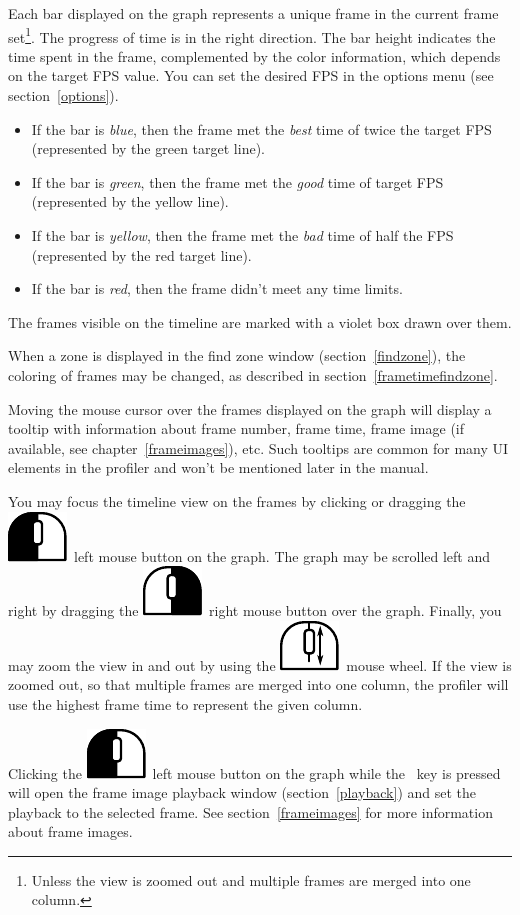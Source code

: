 \documentclass[hidelinks,titlepage,a4paper]{article}
\newcommand{\LMB}{\includegraphics[height=.8\baselineskip]{icons/lmb}}
\newcommand{\RMB}{\includegraphics[height=.8\baselineskip]{icons/rmb}}
\newcommand{\Scroll}{\includegraphics[height=.8\baselineskip]{icons/scroll}}
\begin{document}
Each bar displayed on the graph represents a unique frame in the current frame set\footnote{Unless the view is zoomed out and multiple frames are merged into one column.}. The progress of time is in the right direction. The bar height indicates the time spent in the frame, complemented by the color information, which depends on the target FPS value. You can set the desired FPS in the options menu (see section~\ref{options}).

\begin{itemize}
\item If the bar is \emph{blue}, then the frame met the \emph{best} time of twice the target FPS (represented by the green target line).
\item If the bar is \emph{green}, then the frame met the \emph{good} time of target FPS (represented by the yellow line).
\item If the bar is \emph{yellow}, then the frame met the \emph{bad} time of half the FPS (represented by the red target line).
\item If the bar is \emph{red}, then the frame didn't meet any time limits.
\end{itemize}

The frames visible on the timeline are marked with a violet box drawn over them.

When a zone is displayed in the find zone window (section~\ref{findzone}), the coloring of frames may be changed, as described in section~\ref{frametimefindzone}.

Moving the \faMousePointer{} mouse cursor over the frames displayed on the graph will display a tooltip with information about frame number, frame time, frame image (if available, see chapter~\ref{frameimages}), etc. Such tooltips are common for many UI elements in the profiler and won't be mentioned later in the manual.

You may focus the timeline view on the frames by clicking or dragging the \LMB{}~left mouse button on the graph. The graph may be scrolled left and right by dragging the \RMB{}~right mouse button over the graph. Finally, you may zoom the view in and out by using the \Scroll{}~mouse wheel. If the view is zoomed out, so that multiple frames are merged into one column, the profiler will use the highest frame time to represent the given column.

Clicking the \LMB{}~left mouse button on the graph while the \keys{\ctrl}~key is pressed will open the frame image playback window (section~\ref{playback}) and set the playback to the selected frame. See section~\ref{frameimages} for more information about frame images.
\end{document}
